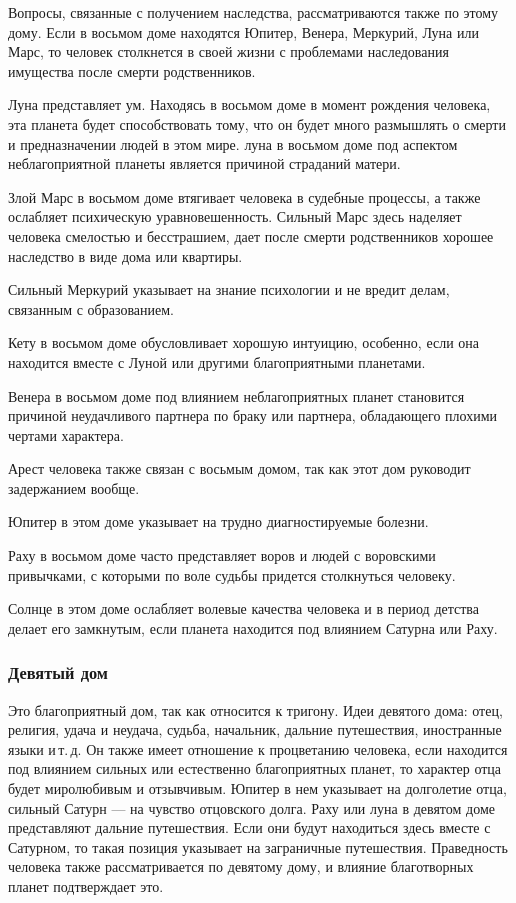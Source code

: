Вопросы, связанные с получением наследства, рассматриваются также по этому дому. Если в восьмом доме находятся Юпитер, Венера, Меркурий, Луна или Марс, то человек столкнется в своей жизни с проблемами наследования имущества после смерти родственников.

Луна представляет ум. Находясь в восьмом доме в момент рождения человека, эта планета будет способствовать тому, что он будет много размышлять о смерти и предназначении людей в этом мире. луна в восьмом доме под аспектом неблагоприятной планеты является причиной страданий матери.

Злой Марс в восьмом доме втягивает человека в судебные процессы, а также ослабляет психическую уравновешенность. Сильный Марс здесь наделяет человека смелостью и бесстрашием, дает после смерти родственников хорошее наследство в виде дома или квартиры.

Сильный Меркурий указывает на знание психологии и не вредит делам, связанным с образованием.

Кету в восьмом доме обусловливает хорошую интуицию, особенно, если она находится вместе с Луной или другими благоприятными планетами.

Венера в восьмом доме под влиянием неблагоприятных планет становится причиной неудачливого партнера по браку или партнера, обладающего плохими чертами характера.

Арест человека также связан с восьмым домом, так как этот дом руководит задержанием вообще.

Юпитер в этом доме указывает на трудно диагностируемые болезни.

Раху в восьмом доме часто представляет воров и людей с воровскими привычками, с которыми по воле судьбы придется столкнуться человеку.

Солнце в этом доме ослабляет волевые качества человека и в период детства делает его замкнутым, если планета находится под влиянием Сатурна или Раху.

\subsubsection*{Девятый дом}

Это благоприятный дом, так как относится к тригону. Идеи девятого дома: отец, религия, удача и неудача, судьба, начальник, дальние путешествия, иностранные языки и\,т.\,д. Он также имеет отношение к процветанию человека, если находится под влиянием сильных или естественно благоприятных планет, то характер отца будет миролюбивым и отзывчивым. Юпитер в нем указывает на долголетие отца, сильный Сатурн --- на чувство отцовского долга. Раху или луна в девятом доме представляют дальние путешествия. Если они будут находиться здесь вместе с Сатурном, то такая позиция указывает на заграничные путешествия. Праведность человека также рассматривается по девятому дому, и влияние благотворных планет подтверждает это.

